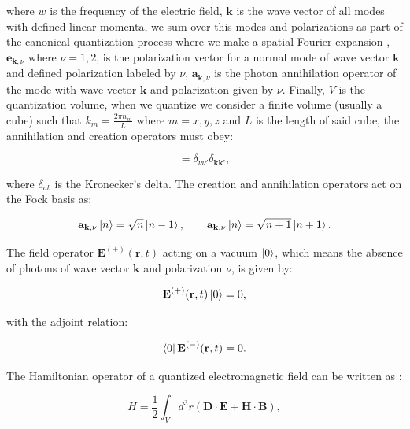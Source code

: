 \documentclass[12pt]{book}
\begin{document}
where $w$ is the frequency of the electric field, $\mathbf{k}$ is the wave vector of all modes with defined linear momenta, we sum over this modes and polarizations as part of the canonical quantization process where we make a spatial Fourier expansion \cite{grynberg}, $\mathbf{e}_{\textbf{k},\nu}$ where $\nu=1,2$, is the polarization vector for a normal mode of wave vector $\mathbf{k}$ and defined polarization labeled by $\nu$, $\mathbf{a}_{\textbf{k},\nu}$ is the photon annihilation operator of the mode with wave vector $\mathbf{k}$ and polarization given by $\nu$. Finally, $V$ is the quantization volume, when we quantize we consider a finite volume (usually a cube) such that $k_{m}=\frac{2 \pi n_{m}}{L}$ where $m=x,y,z$ and $L$ is the length of said cube, the annihilation and creation operators must obey:

\begin{equation}
[\mathbf{a}_{\textbf{k},\nu},\mathbf{a^{\dagger}}_{\textbf{k},\nu}]=\delta_{\nu \nu'}\delta_{\textbf{k}\textbf{k'}},
\end{equation}

where $\delta_{ab}$ is the Kronecker's delta. The creation and annihilation operators act on the Fock basis as:

\begin{equation}
    \mathbf{a}_{\textbf{k},\nu}\ket{n}=\sqrt{n}\ket{n-1},\qquad
    \mathbf{a}_{\textbf{k},\nu}\ket{n}=\sqrt{n+1}\ket{n+1}.\label{Fock}
\end{equation}

The field operator $\textbf{E}^{(+)} (\textbf{r},t)$ acting on a vacuum $\ket{0}$, which means the absence of photons of wave vector $\mathbf{k}$ and polarization $\nu$, is given by:

\begin{equation}
\textbf{E}^{(+)} (\textbf{r},t)\ket{0}=0,
\end{equation}

 with the adjoint relation:

\begin{equation}
\bra{0}\textbf{E}^{(-)} (\textbf{r},t)=0.
\end{equation}

The Hamiltonian operator of a quantized electromagnetic field can be written as \cite{jackson}:

\begin{equation}
H=\frac{1}{2}\int_{V} d^{3}r (\mathbf{D \cdot E}+\mathbf{H \cdot B}),
\end{equation}
\end{document}
